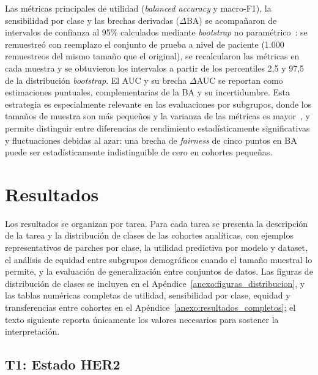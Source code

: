 Las métricas principales de utilidad (\textit{balanced accuracy} y macro-F1), la sensibilidad por clase y las brechas derivadas ($\Delta$BA) se acompañaron de intervalos de confianza al 95\% calculados mediante \textit{bootstrap} no paramétrico~\parencite{riley2025uncertainty}: se remuestreó con reemplazo el conjunto de prueba a nivel de paciente (1.000 remuestreos del mismo tamaño que el original), se recalcularon las métricas en cada muestra y se obtuvieron los intervalos a partir de los percentiles 2,5 y 97,5 de la distribución \textit{bootstrap}. El AUC y su brecha $\Delta$AUC se reportan como estimaciones puntuales, complementarias de la BA y su incertidumbre. Esta estrategia es especialmente relevante en las evaluaciones por subgrupos, donde los tamaños de muestra son más pequeños y la varianza de las métricas es mayor~\parencite{matos2025critical}, y permite distinguir entre diferencias de rendimiento estadísticamente significativas y fluctuaciones debidas al azar: una brecha de \textit{fairness} de cinco puntos en BA puede ser estadísticamente indistinguible de cero en cohortes pequeñas.

\section{Resultados}
\label{sec:resultados}

Los resultados se organizan por tarea. Para cada tarea se presenta la descripción de la tarea y la distribución de clases de las cohortes analíticas, con ejemplos representativos de parches por clase, la utilidad predictiva por modelo y dataset, el análisis de equidad entre subgrupos demográficos cuando el tamaño muestral lo permite, y la evaluación de generalización entre conjuntos de datos. Las figuras de distribución de clases se incluyen en el Apéndice~\ref{anexo:figuras_distribucion}, y las tablas numéricas completas de utilidad, sensibilidad por clase, equidad y transferencias entre cohortes en el Apéndice~\ref{anexo:resultados_completos}; el texto siguiente reporta únicamente los valores necesarios para sostener la interpretación.

\subsection{T1: Estado HER2}
\label{sec:resultado_her2}


